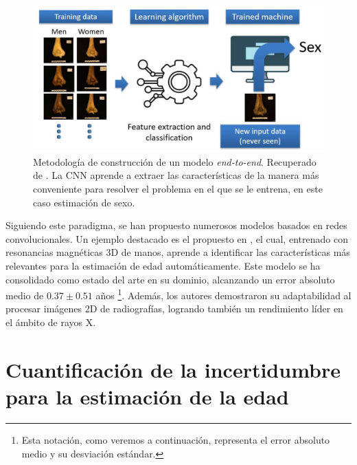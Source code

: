 \begin{figure}[htbp]
    \centering
    \includegraphics[width=\textwidth]{capitulos/cap_03/imagenes/end-to-end_learning.png}
    \caption[
        Metodología de construcción de un modelo \textit{end-to-end}. 
        Recuperado de \cite{venema2022}.
    ]{
        Metodología de construcción de un modelo \textit{end-to-end}. 
        Recuperado de \cite{venema2022}.
        La CNN aprende a extraer las características de la manera más conveniente para resolver el problema en el que se le entrena, en este caso estimación de sexo.
    }
    \label{fig:end-to-end_model}
\end{figure}

Siguiendo este paradigma, se han propuesto numerosos modelos basados en redes convolucionales. Un ejemplo destacado es el propuesto en \cite{stern2019}, el cual, entrenado con resonancias magnéticas 3D de manos, aprende a identificar las características más relevantes para la estimación de edad automáticamente. Este modelo se ha consolidado como estado del arte en su dominio, alcanzando un error absoluto medio de $0.37 \pm 0.51$ años%
\footnote{
    Esta notación, como veremos a continuación, representa el error absoluto medio y su desviación estándar.
}. 
Además, los autores demostraron su adaptabilidad al procesar imágenes 2D de radiografías, logrando también un rendimiento líder en el ámbito de rayos X.


\section{Cuantificación de la incertidumbre para la estimación de la edad}



